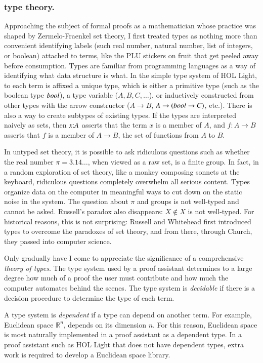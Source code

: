 \documentclass{llncs}
\def\op#1{{\hbox{#1}}}
\def\tc{\hbox{:}}
\newcommand{\ring}[1]{\mathbb{#1}}
\begin{document}
\subsubsection{type theory.}

Approaching the subject of formal proofs as a mathematician whose
practice was shaped by Zermelo-Fraenkel set theory, I first treated
types as nothing more than convenient identifying labels (such real
number, natural number, list of integers, or boolean) attached to
terms, like the
PLU stickers on fruit that get peeled away before consumption.  Types
are familiar from programming languages as a way of identifying what
data structure is what.  In the simple type system of HOL Light, to
each term is affixed a unique type, which is either a primitive type
(such as the boolean type $\op{\it bool}$), a type variable
($A,B,C,\ldots$), or inductively constructed from other types with the
arrow constructor ($A\rightarrow B$, $A\rightarrow (\op{\it bool}
\rightarrow C)$, etc.).  There is also a way to create subtypes of
existing types.  If the types are interpreted naively as sets, then
$x\tc A$ asserts that the term $x$ is a member of $A$, and
$f:A\rightarrow B$ asserts that $f$ is a member of $A\rightarrow B$,
the set of functions from $A$ to $B$.

In untyped set theory, it is possible to ask ridiculous questions such
as whether the real number $\pi=3.14\ldots$, when viewed as a raw set,
is a finite group.  In fact, in a random exploration of set theory,
like a monkey composing sonnets at the keyboard, ridiculous questions
completely overwhelm all serious content.  Types organize data on the
computer in meaningful ways to cut down on the static noise in the
system.  The question about $\pi$ and groups is not well-typed and
cannot be asked.  Russell's paradox also disappears: $X \not\in X$ is
not well-typed.  For historical reasons, this is not surprising:
Russell and Whitehead first introduced types to overcome the paradoxes of
set theory, and from there, through Church, they passed into computer
science.


Only gradually have I come to appreciate the significance of a
comprehensive {\it theory of types}.  The type system used by a proof
assistant determines to a large degree how much of a proof the user
must contribute and how much the computer automates behind the scenes.
The type system is {\it decidable} if there is a decision procedure to
determine the type of each term.

A type system is {\it dependent} if a type can depend on 
another term.  For example, Euclidean space $\ring{R}^n$, depends on
its dimension $n$.  For this reason, Euclidean space is most naturally
implemented in a proof assistant as a dependent type.  
In a proof assistant such as HOL Light that does not have dependent types,
extra work is required to develop a Euclidean space library.
\end{document}
